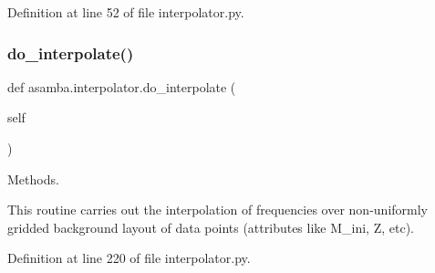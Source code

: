 Definition at line 52 of file interpolator.\+py.

\mbox{\label{namespaceasamba_1_1interpolator_aff5340f78b8876634959393cd58587d4}} 
\subsubsection{\texorpdfstring{do\+\_\+interpolate()}{do\_interpolate()}}
{\footnotesize\ttfamily def asamba.\+interpolator.\+do\+\_\+interpolate (\begin{DoxyParamCaption}\item[{}]{self }\end{DoxyParamCaption})}



Methods. 

\begin{DoxyVerb}This routine carries out the interpolation of frequencies over non-uniformly 
gridded background layout of data points (attributes like M_ini, Z, etc).
\end{DoxyVerb}
 

Definition at line 220 of file interpolator.\+py.

